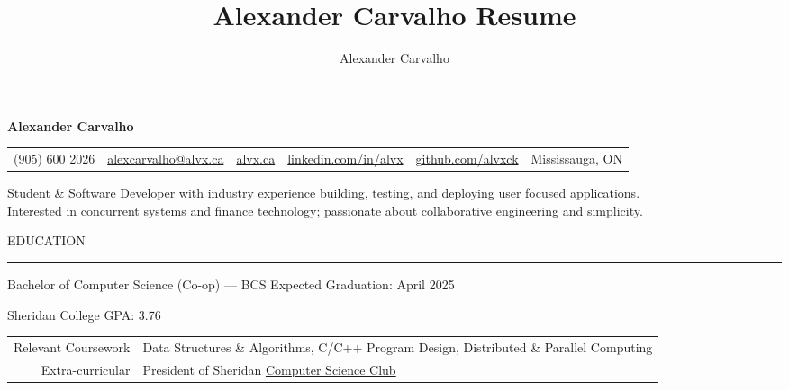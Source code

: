 \documentclass[9pt]{extarticle}
\title{Alexander Carvalho Resume}
\author{Alexander Carvalho}
\begin{document}

\begin{center}
	\textbf{\Huge Alexander Carvalho}

	\begin{tabular}{ c c c c c c }
		(905) 600 2026 & 
		\href{mailto:alexcarvalho@alvx.ca}{alexcarvalho@alvx.ca} & 
		\href{alvx.ca}{alvx.ca} & 
		\href{https://www.linkedin.com/in/alvx}{linkedin.com/in/alvx} & 
		\href{https://www.github.com/alvxck}{github.com/alvxck} & 
		Mississauga, ON
	\end{tabular}

	\vspace{5pt}	

	Student \& Software Developer with industry experience building, testing, and deploying user focused applications.  \\
	Interested in concurrent systems and finance technology; passionate about collaborative engineering and simplicity.
\end{center}


\begin{adjustwidth}{4pt}{4pt} EDUCATION \end{adjustwidth}
\rule[8pt]{\linewidth}{0.4pt}

\begin{adjustwidth}{14pt}{14pt}
	Bachelor of Computer Science (Co-op) — BCS \hfill Expected Graduation: April 2025
	
	Sheridan College \hfill GPA: 3.76
	
	\begin{tabular}{ r l }
	 	Relevant Coursework & Data Structures \& Algorithms, C/C++ Program Design, Distributed \& Parallel Computing \\ 
		Extra-curricular & President of Sheridan \href{https://sheridancollege.campuslabs.ca/engage/organization/mobilecomputingclub}{Computer Science Club} \\
	\end{tabular}
\end{adjustwidth}




\end{document}
